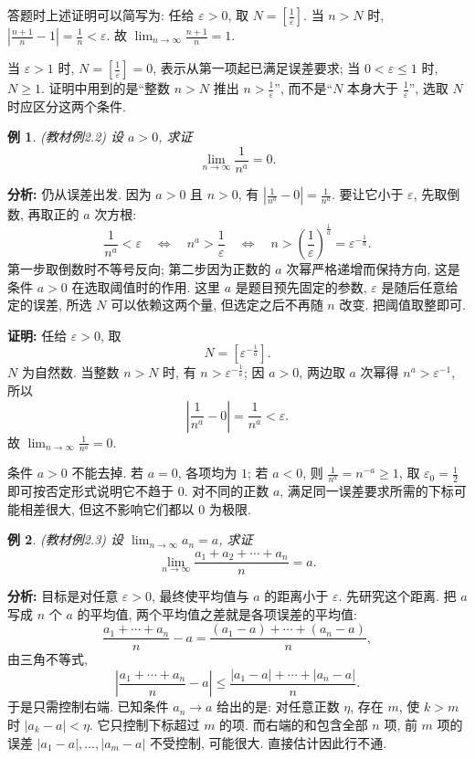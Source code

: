 \documentclass[UTF8,openany]{ctexbook}
\theoremstyle{chinesetextbook}
\newtheorem{example}{例}[section]
\newenvironment{cnproof}{\par\indent\textbf{证明:} \ignorespaces}{\par}
\begin{document}
答题时上述证明可以简写为: 任给 $\varepsilon>0$, 取 $\displaystyle N=\left[\frac1\varepsilon\right]$. 当 $n>N$ 时, $\displaystyle\left|\frac{n+1}{n}-1\right|=\frac1n<\varepsilon$. 故 $\displaystyle\lim_{n\to\infty}\frac{n+1}{n}=1$.

当 $\varepsilon>1$ 时, $\displaystyle N=\left[\frac1\varepsilon\right]=0$, 表示从第一项起已满足误差要求; 当 $0<\varepsilon\le1$ 时, $N\ge1$. 证明中用到的是“整数 $n>N$ 推出 $\displaystyle n>\frac1\varepsilon$”, 而不是“$N$ 本身大于 $\displaystyle\frac1\varepsilon$”, 选取 $N$ 时应区分这两个条件.

\begin{example}
\textnormal{(教材例2.2)} 设 $a>0$, 求证
\[
\lim_{n\to\infty}\frac1{n^a}=0.
\]
\end{example}

\par\indent\textbf{分析:} 仍从误差出发. 因为 $a>0$ 且 $n>0$, 有 $\displaystyle\left|\frac1{n^a}-0\right|=\frac1{n^a}$. 要让它小于 $\varepsilon$, 先取倒数, 再取正的 $a$ 次方根:
\[
\frac1{n^a}<\varepsilon
\quad\Longleftrightarrow\quad
n^a>\frac1\varepsilon
\quad\Longleftrightarrow\quad
n>\left(\frac1\varepsilon\right)^{\frac1a}
=\varepsilon^{-\frac1a}.
\]
第一步取倒数时不等号反向; 第二步因为正数的 $a$ 次幂严格递增而保持方向, 这是条件 $a>0$ 在选取阈值时的作用. 这里 $a$ 是题目预先固定的参数, $\varepsilon$ 是随后任意给定的误差, 所选 $N$ 可以依赖这两个量, 但选定之后不再随 $n$ 改变. 把阈值取整即可.

\begin{cnproof}
任给 $\varepsilon>0$, 取
\[
N=\left[\varepsilon^{-\frac1a}\right].
\]
$N$ 为自然数. 当整数 $n>N$ 时, 有 $\displaystyle n>\varepsilon^{-\frac1a}$; 因 $a>0$, 两边取 $a$ 次幂得 $n^a>\varepsilon^{-1}$, 所以
\[
\left|\frac1{n^a}-0\right|=\frac1{n^a}<\varepsilon.
\]
故 $\displaystyle \lim_{n\to\infty}\frac{1}{n^a}=0$.
\end{cnproof}

条件 $a>0$ 不能去掉. 若 $a=0$, 各项均为 $1$; 若 $a<0$, 则 $\displaystyle\frac1{n^a}=n^{-a}\ge1$, 取 $\displaystyle\varepsilon_0=\frac12$ 即可按否定形式说明它不趋于 $0$. 对不同的正数 $a$, 满足同一误差要求所需的下标可能相差很大, 但这不影响它们都以 $0$ 为极限.

\begin{example}
\textnormal{(教材例2.3)} 设 $\displaystyle \lim_{n\to\infty}a_n=a$, 求证
\[
\lim_{n\to\infty}\frac{a_1+a_2+\cdots+a_n}{n}=a.
\]
\end{example}

\par\indent\textbf{分析:} 目标是对任意 $\varepsilon>0$, 最终使平均值与 $a$ 的距离小于 $\varepsilon$. 先研究这个距离. 把 $a$ 写成 $n$ 个 $a$ 的平均值, 两个平均值之差就是各项误差的平均值:
\[
\frac{a_1+\cdots+a_n}{n}-a
=\frac{(a_1-a)+\cdots+(a_n-a)}{n},
\]
由三角不等式,
\[
\left|\frac{a_1+\cdots+a_n}{n}-a\right|
\le\frac{|a_1-a|+\cdots+|a_n-a|}{n}.
\]
于是只需控制右端. 已知条件 $a_n\to a$ 给出的是: 对任意正数 $\eta$, 存在 $m$, 使 $k>m$ 时 $|a_k-a|<\eta$. 它只控制下标超过 $m$ 的项. 而右端的和包含全部 $n$ 项, 前 $m$ 项的误差 $|a_1-a|,\ldots,|a_m-a|$ 不受控制, 可能很大. 直接估计因此行不通.
\end{document}
